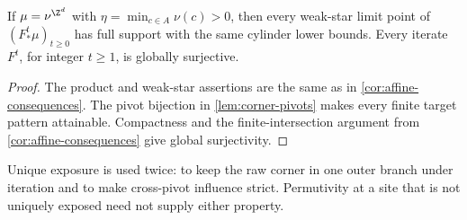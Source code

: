 \begin{corollary}\label{cor:corner-consequences}
If $\mu=\nu^{\Z^d}$ with
$\eta=\min_{c\in A}\nu(c)>0$, then every weak-star limit point of
$(F^t_*\mu)_{t\geq0}$ has full support with the same cylinder lower bounds.
Every iterate $F^t$, for integer $t\geq1$, is globally surjective.
\end{corollary}

\begin{proof}
The product and weak-star assertions are the same as in
\cref{cor:affine-consequences}.  The pivot bijection in
\cref{lem:corner-pivots} makes every finite target pattern attainable.
Compactness and the finite-intersection argument from
\cref{cor:affine-consequences} give global surjectivity.
\end{proof}

\begin{remark}\label{rem:corner-scope}
Unique exposure is used twice: to keep the raw corner in one outer branch
under iteration and to make cross-pivot influence strict.  Permutivity at a
site that is not uniquely exposed need not supply either property.
\end{remark}
